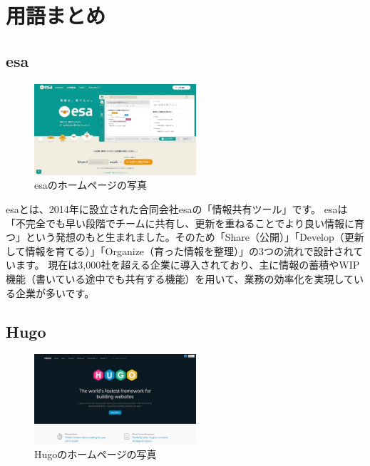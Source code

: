 \chapter{用語まとめ}

\section{esa}

  \begin{figure}[H]
    \centering
    \includegraphics[width=6cm]{./image/02-chap3/esa.png}
    \caption{esaのホームページの写真}
    \label{chap3-esa-image}
  \end{figure}


  \begin{tcolorbox}[title=esaとは]
    esaとは、2014年に設立された合同会社esaの「情報共有ツール」です。
    esaは「不完全でも早い段階でチームに共有し、更新を重ねることでより良い情報に育つ」という発想のもと生まれました。そのため「Share（公開）」「Develop（更新して情報を育てる）」「Organize（育った情報を整理）」の3つの流れで設計されています。
    現在は3,000社を超える企業に導入されており、主に情報の蓄積やWIP機能（書いている途中でも共有する機能）を用いて、業務の効率化を実現している企業が多いです。
    \cite{esaとは} \cite{公式esaWeb}

  \end{tcolorbox}

\section{Hugo}

  \begin{figure}[H]
    \centering
    \includegraphics[width=6cm]{./image/02-chap3/hugo.png}
    \caption{Hugoのホームページの写真}
    \label{chap3-hugo-image}
  \end{figure}

